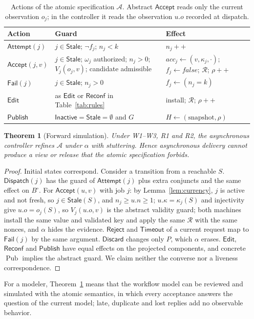 \documentclass[pdflatex,sn-mathphys-num]{sn-jnl}
\theoremstyle{thmstyleone}%
\newtheorem{theorem}{Theorem}%
\theoremstyle{thmstyletwo}%
\theoremstyle{thmstylethree}%
\newcommand{\key}{\kappa}
\newcommand{\Pub}{\operatorname{Pub}}
\newcommand{\Stale}{\mathsf{Stale}}
\newcommand{\Inact}{\mathsf{Inactive}}
\newcommand{\Acc}{\mathsf{Accept}}
\newcommand{\Disp}{\mathsf{Dispatch}}
\begin{document}
\begin{table}[!ht]
\caption{Actions of the atomic specification $\mathcal A$. Abstract $\mathsf{Accept}$ reads only the current observation $o_j$; in the controller it reads the observation $u.o$ recorded at dispatch.}\label{tab:abstract}
\footnotesize\setlength{\tabcolsep}{3pt}
\begin{tabular}{@{}lP{55mm}P{50mm}@{}}\toprule
Action & Guard & Effect\\\midrule
$\mathsf{Attempt}(j)$ & $j\in\Stale$; $\neg f_j$; $n_j<k$ & $n_j{+}{+}$\\
$\mathsf{Accept}(j,v)$ & $j\in\Stale$; $\omega_j$ authorized; $n_j>0$; $V_j(o_j,v)$; candidate admissible & $\mathit{acc}_j\gets(v,\key_j,\cdot)$; $f_j\gets\mathit{false}$; $\mathcal R$; $\rho{+}{+}$\\
$\mathsf{Fail}(j)$ & $j\in\Stale$; $n_j>0$ & $f_j\gets(n_j=k)$\\
$\mathsf{Edit}$ & as $\mathsf{Edit}$ or $\mathsf{Reconf}$ in Table~\ref{tab:rules} & install; $\mathcal R$; $\rho{+}{+}$\\
$\mathsf{Publish}$ & $\Inact=\Stale=\emptyset$ and $G$ & $H\gets(\text{snapshot},\rho)$\\\bottomrule
\end{tabular}
\end{table}

\begin{theorem}[Forward simulation]\label{thm:refinement}
Under W1--W3, R1 and R2, the asynchronous controller refines $\mathcal A$ under $\alpha$ with stuttering. Hence asynchronous delivery cannot produce a view or release that the atomic specification forbids.
\end{theorem}
\begin{proof}
Initial states correspond. Consider a transition from a reachable $S$. $\Disp(j)$ has the guard of $\mathsf{Attempt}(j)$ plus extra conjuncts and the same effect on $B^{\circ}$. For $\Acc(u,v)$ with job $j$: by Lemma~\ref{lem:currency}, $j$ is active and not fresh, so $j\in\Stale(S)$, and $n_j\ge u.n\ge1$; $u.\key=\key_j(S)$ and injectivity give $u.o=o_j(S)$, so $V_j(u.o,v)$ is the abstract validity guard; both machines install the same value and validated key and apply the same $\mathcal R$ with the same nonces, and $\alpha$ hides the evidence. $\mathsf{Reject}$ and $\mathsf{Timeout}$ of a current request map to $\mathsf{Fail}(j)$ by the same argument. $\mathsf{Discard}$ changes only $P$, which $\alpha$ erases. $\mathsf{Edit}$, $\mathsf{Reconf}$ and $\mathsf{Publish}$ have equal effects on the projected components, and concrete $\Pub$ implies the abstract guard. We claim neither the converse nor a liveness correspondence.
\end{proof}
For a modeler, Theorem~\ref{thm:refinement} means that the workflow model can be reviewed and simulated with the atomic semantics, in which every acceptance answers the question of the current model; late, duplicate and lost replies add no observable behavior.
\end{document}
